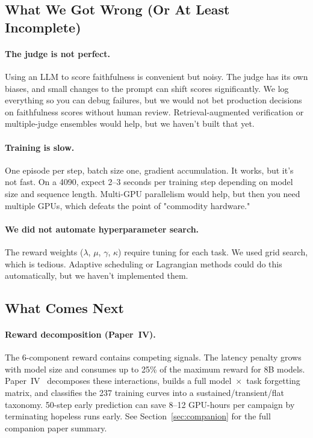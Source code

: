\documentclass[11pt]{article}
\begin{document}
\subsection{What We Got Wrong (Or At Least Incomplete)}

\paragraph{The judge is not perfect.}
Using an LLM to score faithfulness is convenient but noisy.
The judge has its own biases, and small changes to the prompt can shift scores significantly.
We log everything so you can debug failures, but we would not bet production decisions on faithfulness scores without human review.
Retrieval-augmented verification or multiple-judge ensembles would help, but we haven't built that yet.

\paragraph{Training is slow.}
One episode per step, batch size one, gradient accumulation.
It works, but it's not fast.
On a 4090, expect 2--3 seconds per training step depending on model size and sequence length.
Multi-GPU parallelism would help, but then you need multiple GPUs, which defeats the point of "commodity hardware."

\paragraph{We did not automate hyperparameter search.}
The reward weights ($\lambda$, $\mu$, $\gamma$, $\kappa$) require tuning for each task.
We used grid search, which is tedious.
Adaptive scheduling or Lagrangian methods could do this automatically, but we haven't implemented them.

\subsection{What Comes Next}

\paragraph{Reward decomposition (Paper~IV).}
The 6-component reward contains competing signals.  The latency penalty grows with model size and consumes up to 25\% of the maximum reward for 8B models.
Paper~IV~\citep{maloney2025dynamics} decomposes these interactions, builds a full model~$\times$~task forgetting matrix, and classifies the 237 training curves into a sustained/transient/flat taxonomy.  50-step early prediction can save 8--12 GPU-hours per campaign by terminating hopeless runs early.
See Section~\ref{sec:companion} for the full companion paper summary.
\end{document}

